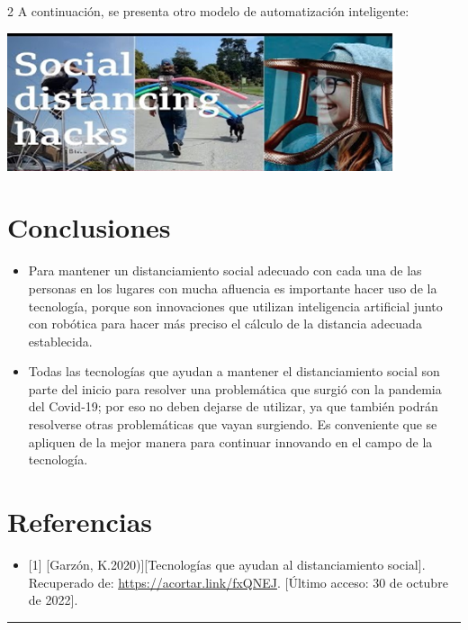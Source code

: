 \documentclass[12pt,spanish,Letterpaper,openany]{book}
\providecommand{\tightlist}{%
  \setlength{\itemsep}{0pt}\setlength{\parskip}{0pt}}
\newcommand{\HRule}{\begin{center}\rule{0.5\linewidth}{0.2mm}\end{center}}
\begin{document}
\begin {multicols}{2}
A continuación, se presenta otro modelo de automatización inteligente:

\begin {flushleft}
\noindent\begin{minipage}[c]{\columnwidth}

\begin{center}\includegraphics[width=1\linewidth]{images/tum5} \end{center}

\end{minipage}
\end {flushleft}

\hypertarget{conclusiones-7}{%
\section{Conclusiones}\label{conclusiones-7}}

\begin{itemize}
\item
  Para mantener un distanciamiento social adecuado con cada una de las personas en los lugares con mucha afluencia es importante hacer uso de la tecnología, porque son innovaciones que utilizan inteligencia artificial junto con robótica para hacer más preciso el cálculo de la distancia adecuada establecida.
\item
  Todas las tecnologías que ayudan a mantener el distanciamiento social son parte del inicio para resolver una problemática que surgió con la pandemia del Covid-19; por eso no deben dejarse de utilizar, ya que también podrán resolverse otras problemáticas que vayan surgiendo. Es conveniente que se apliquen de la mejor manera para continuar innovando en el campo de la tecnología.
\end{itemize}

\hypertarget{referencias-6}{%
\section{Referencias}\label{referencias-6}}

\begin{itemize}
\tightlist
\item
  {[}1{]} {[}Garzón, K.2020){]}{[}Tecnologías que ayudan al distanciamiento social{]}. Recuperado de: \url{https://acortar.link/fxQNEJ}. {[}Último acceso: 30 de octubre de 2022{]}.
\end{itemize}

\end {multicols}
\medskip
\HRule
\medskip
\end{document}
